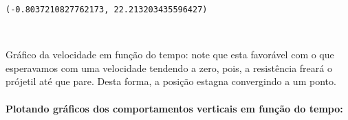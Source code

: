 \documentclass[12pt, a4paper]{article}
\makeatletter
\newcommand{\boxspacing}{\kern\kvtcb@left@rule\kern\kvtcb@boxsep}
\newcommand{\prompt}[4]{
        {\ttfamily\llap{{\color{#2}[#3]:\hspace{3pt}#4}}\vspace{-\baselineskip}}
    }
\makeatother
\begin{document}
            \begin{tcolorbox}[breakable, size=fbox, boxrule=.5pt, pad at break*=1mm, opacityfill=0]
\prompt{Out}{outcolor}{6}{\boxspacing}
\begin{Verbatim}[commandchars=\\\{\}]
(-0.8037210827762173, 22.213203435596427)
\end{Verbatim}
\end{tcolorbox}
        
    \begin{center}
    \end{center}
    { \hspace*{\fill} \\}
    
    Gráfico da velocidade em função do tempo: note que esta favorável com o
que esperavamos com uma velocidade tendendo a zero, pois, a resistência
freará o prójetil até que pare. Desta forma, a posição estagna
convergindo a um ponto.

\hypertarget{plotando-gruxe1ficos-dos-comportamentos-verticais-em-funuxe7uxe3o-do-tempo}{%
\paragraph{Plotando gráficos dos comportamentos verticais em função do
tempo:}\label{plotando-gruxe1ficos-dos-comportamentos-verticais-em-funuxe7uxe3o-do-tempo}}
\end{document}
